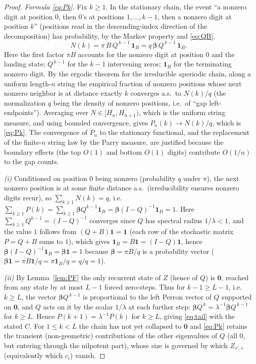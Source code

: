 \documentclass[12pt]{article}
\theoremstyle{definition}
\newcommand{\one}{\mathbf{1}}
\begin{document}
\begin{proof}
\emph{Formula \eqref{eq:Pk}.} Fix $k\ge1$. In the stationary chain, the event
``a nonzero digit at position $0$, then $0$'s at positions $1,\dots,k-1$, then a
nonzero digit at position $k$'' (positions read in the descending-index
direction of the decomposition) has probability, by the Markov property and
\eqref{eq:QB},
\[
N(k)=\pi\,B\,Q^{\,k-1}\,\mathbf 1_B
=q\,\boldsymbol\beta\,Q^{\,k-1}\,\mathbf 1_B .
\]
Here the first factor $\pi B$ accounts for the nonzero digit at position $0$ and
the landing state; $Q^{\,k-1}$ for the $k-1$ intervening zeros; $\mathbf 1_B$ for
the terminating nonzero digit. By the ergodic theorem for the irreducible
aperiodic chain, along a uniform length-$n$ string the empirical fraction of
nonzero positions whose next nonzero neighbor is at distance exactly $k$ converges
a.s.\ to $N(k)/q$ (the normalization $q$ being the density of nonzero positions,
i.e.\ of ``gap left-endpoints''). Averaging over $N\in[H_n,H_{n+1})$, which is the
uniform string measure, and using bounded convergence, gives
$P_n(k)\to N(k)/q$, which is \eqref{eq:Pk}. The convergence of $P_n$ to the
stationary functional, and the replacement of the finite-$n$ string law by the
Parry measure, are justified because the boundary effects (the top $O(1)$ and
bottom $O(1)$ digits) contribute $O(1/n)$ to the gap counts.

\emph{(i)} Conditioned on position $0$ being nonzero (probability $q$ under
$\pi$), the next nonzero position is at some finite distance a.s.\ (irreducibility
ensures nonzero digits recur), so $\sum_{k\ge1}N(k)=q$, i.e.\
$\sum_{k\ge1}P(k)=\sum_{k\ge1}\boldsymbol\beta Q^{k-1}\mathbf 1_B
=\boldsymbol\beta(I-Q)^{-1}\mathbf 1_B=1$. Here $\sum_{k\ge1}Q^{k-1}=(I-Q)^{-1}$
converges since $Q$ has spectral radius $1/\lambda<1$, and the value $1$ follows
from $(Q+B)\one=\one$ (each row of the stochastic matrix $P=Q+B$ sums to $1$),
which gives $\mathbf 1_B=B\one=(I-Q)\one$, hence
$\boldsymbol\beta(I-Q)^{-1}\mathbf 1_B=\boldsymbol\beta\one=1$ because
$\boldsymbol\beta=\pi B/q$ is a probability vector
($\boldsymbol\beta\one=\pi B\one/q=\pi\mathbf 1_B/q=q/q=1$).

\emph{(ii)} By Lemma~\ref{lem:PF} the only recurrent state of $Z$ (hence of $Q$)
is $\mathbf 0$, reached from any state by at most $L-1$ forced zero-steps. Thus
for $k-1\ge L-1$, i.e.\ $k\ge L$, the vector $\boldsymbol\beta Q^{\,k-1}$ is
proportional to the left Perron vector of $Q$ supported on $\mathbf 0$, and
$Q$ acts on it by the scalar $1/\lambda$ at each further step:
$\boldsymbol\beta Q^{\,k}=\lambda^{-1}\boldsymbol\beta Q^{\,k-1}$ for $k\ge L$.
Hence $P(k+1)=\lambda^{-1}P(k)$ for $k\ge L$, giving \eqref{eq:tail} with the
stated $C$. For $1\le k<L$ the chain has not yet collapsed to $\mathbf 0$ and
\eqref{eq:Pk} retains the transient (non-geometric) contributions of the other
eigenvalues of $Q$ (all $0$, but entering through the nilpotent part), whose
size is governed by which $Z_{s',s}$ (equivalently which $c_i$) vanish.


\end{proof}
\end{document}
